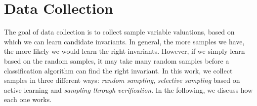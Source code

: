 
\section{Data Collection} %
\label{sec:sampling}
The goal of data collection is to collect sample variable valuations, based on which we can learn candidate invariants. In general, the more samples we have, the more likely we would learn the right invariants. However, if we simply learn based on the random samples, it may take many random samples before a classification algorithm can find the right invariant. In this work, we collect samples in three different ways: \emph{random sampling}, \emph{selective sampling} based on active learning and \emph{sampling through verification}. In the following, we discuss how each one works.


